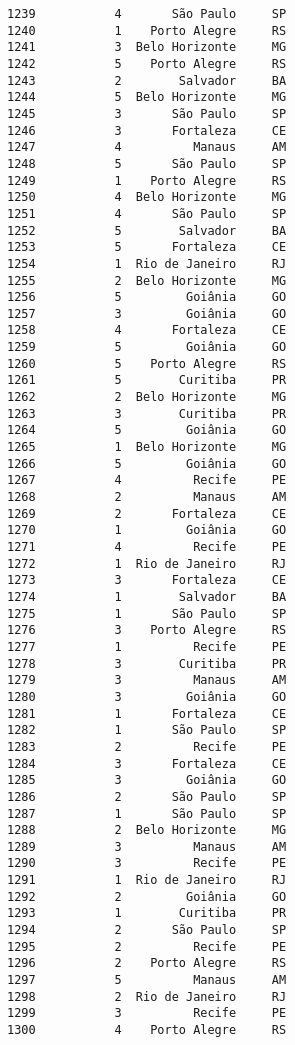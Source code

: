 \documentclass[11pt]{article}
\begin{document}
\begin{Verbatim}[commandchars=\\\{\}]
1239           4       São Paulo     SP  
1240           1    Porto Alegre     RS  
1241           3  Belo Horizonte     MG  
1242           5    Porto Alegre     RS  
1243           2        Salvador     BA  
1244           5  Belo Horizonte     MG  
1245           3       São Paulo     SP  
1246           3       Fortaleza     CE  
1247           4          Manaus     AM  
1248           5       São Paulo     SP  
1249           1    Porto Alegre     RS  
1250           4  Belo Horizonte     MG  
1251           4       São Paulo     SP  
1252           5        Salvador     BA  
1253           5       Fortaleza     CE  
1254           1  Rio de Janeiro     RJ  
1255           2  Belo Horizonte     MG  
1256           5         Goiânia     GO  
1257           3         Goiânia     GO  
1258           4       Fortaleza     CE  
1259           5         Goiânia     GO  
1260           5    Porto Alegre     RS  
1261           5        Curitiba     PR  
1262           2  Belo Horizonte     MG  
1263           3        Curitiba     PR  
1264           5         Goiânia     GO  
1265           1  Belo Horizonte     MG  
1266           5         Goiânia     GO  
1267           4          Recife     PE  
1268           2          Manaus     AM  
1269           2       Fortaleza     CE  
1270           1         Goiânia     GO  
1271           4          Recife     PE  
1272           1  Rio de Janeiro     RJ  
1273           3       Fortaleza     CE  
1274           1        Salvador     BA  
1275           1       São Paulo     SP  
1276           3    Porto Alegre     RS  
1277           1          Recife     PE  
1278           3        Curitiba     PR  
1279           3          Manaus     AM  
1280           3         Goiânia     GO  
1281           1       Fortaleza     CE  
1282           1       São Paulo     SP  
1283           2          Recife     PE  
1284           3       Fortaleza     CE  
1285           3         Goiânia     GO  
1286           2       São Paulo     SP  
1287           1       São Paulo     SP  
1288           2  Belo Horizonte     MG  
1289           3          Manaus     AM  
1290           3          Recife     PE  
1291           1  Rio de Janeiro     RJ  
1292           2         Goiânia     GO  
1293           1        Curitiba     PR  
1294           2       São Paulo     SP  
1295           2          Recife     PE  
1296           2    Porto Alegre     RS  
1297           5          Manaus     AM  
1298           2  Rio de Janeiro     RJ  
1299           3          Recife     PE  
1300           4    Porto Alegre     RS  

\end{Verbatim}
\end{document}
